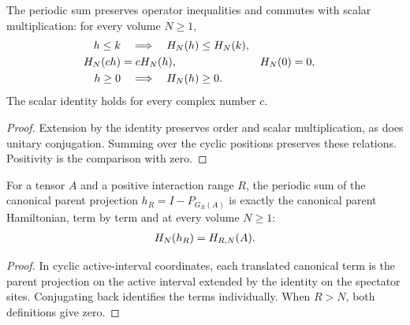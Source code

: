 \begin{lemma}
    \label{thm:periodic-fixed-interaction-order}
    \leanok
    The periodic sum preserves operator inequalities
    and commutes with scalar multiplication: for every
    volume $N\ge1$,
    \begin{align}
        h\leq k & \quad\Longrightarrow\quad H_N(h)\leq H_N(k),\notag                      \\
        H_N(ch) & =cH_N(h),                                          & H_N(0) & =0,\notag \\
        h\geq0  & \quad\Longrightarrow\quad H_N(h)\geq0.\notag
    \end{align}
    The scalar identity holds for every complex number $c$.
\end{lemma}
\begin{proof}\leanok
    Extension by the identity preserves order and scalar multiplication,
    as does unitary conjugation. Summing over the cyclic positions preserves
    these relations. Positivity is the comparison with zero.
\end{proof}

\begin{lemma}
    \label{thm:periodic-fixed-interaction-canonical}
    \leanok
    For a tensor $A$ and a positive interaction range $R$, the periodic
    sum of the canonical parent projection $h_R=I-P_{G_R(A)}$ is exactly the
    canonical parent Hamiltonian, term by term and at every volume $N\ge1$:
    \begin{align}
        H_N(h_R)=H_{R,N}(A).\notag
    \end{align}
\end{lemma}
\begin{proof}\leanok
    In cyclic active-interval coordinates, each translated canonical term
    is the parent projection on the active interval extended by the
    identity on the spectator sites. Conjugating back identifies the terms
    individually. When $R>N$, both definitions give zero.
\end{proof}

